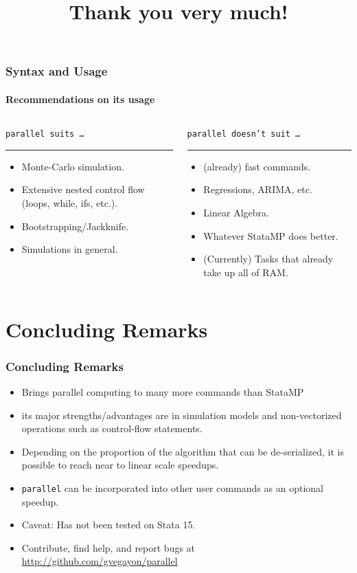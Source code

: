 \documentclass[9pt,\ExtraDocOpts]{beamer}
\begin{document}
\begin{frame}
\frametitle{Syntax and Usage}
\framesubtitle{Recommendations on its usage}

\begin{columns}
\begin{column}{.5\textwidth}
{\color{gray}
{\tt parallel suits \ldots}
\rule{\linewidth}{4pt}}
\begin{itemize}
\item Monte-Carlo simulation.\pause{}
\item Extensive nested control flow (loops, while, ifs, etc.).\pause{}
\item Bootstrapping/Jackknife.\pause{}
\item Simulations in general.\pause{}
\end{itemize}
\end{column}%
\hfill%
\begin{column}{.5\textwidth}
{\color{gray}
{\tt parallel doesn't suit \ldots}
\rule{\linewidth}{4pt}}
\begin{itemize}
\item (already) fast commands.\pause{}
\item Regressions, ARIMA, etc.\pause{}
\item Linear Algebra.\pause{}
\item Whatever StataMP does better.\pause{}
\item (Currently) Tasks that already take up all of RAM.
\end{itemize}
\end{column}%
\end{columns}
\end{frame}

\section{Concluding Remarks}

\begin{frame}
\frametitle{Concluding Remarks}

\begin{itemize}
\item Brings parallel computing to many more commands than StataMP \pause{}
\item its major strengths/advantages are in simulation models and non-vectorized operations such as control-flow statements.\pause{}
\item Depending on the proportion of the algorithm that can be de-serialized, it is possible to reach near to linear scale speedups.\pause{}
\item {\tt parallel} can be incorporated into other user commands as an optional speedup.  \pause{}
\item Caveat: Has not been tested on Stata 15.\pause{}
\item Contribute, find help, and report bugs at \url{http://github.com/gvegayon/parallel}\pause{}

\end{itemize}

\end{frame}

\title{Thank you very much!}

\frame{\maketitle
}
\end{document}
